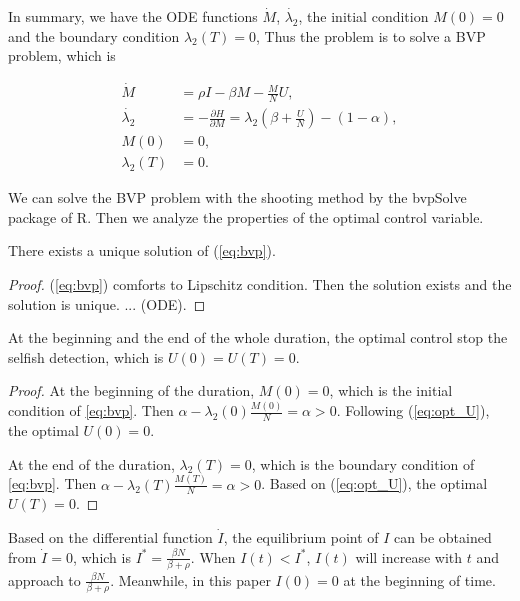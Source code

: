 In summary, we have the ODE functions $\dot{M}$, $\dot{\lambda_{2}}$,
the initial condition $M(0)=0$ and the boundary condition $\lambda_{2}(T)=0$,
Thus the problem is to solve a BVP problem,
which is
\begin{small}
\begin{equation}
\label{eq:bvp}
\begin{aligned}
\dot{M} &= \rho I  - \beta M - \frac{M}{N} U,\\
\dot{\lambda_{2}} &= - \frac{ \partial H}{ \partial M} = \lambda_{2} (\beta + \frac{U}{N} ) - (1-\alpha),\\
M(0) &= 0,\\
\lambda_{2}(T) &= 0.
\end{aligned}
\end{equation}
\end{small}
We can solve the BVP problem with the shooting method by the bvpSolve package of R.
Then we analyze the properties of the optimal control variable.
\begin{lem}
There exists a unique solution of (\ref{eq:bvp}).
\end{lem}
\begin{proof}
(\ref{eq:bvp}) comforts to Lipschitz condition.
Then the solution exists and the solution is unique. ... (ODE).
\end{proof}

\begin{lem}At the beginning and the end of the whole duration,
the optimal control stop the selfish detection,
which is $U(0)=U(T)=0$.
\end{lem}

\begin{proof}
At the beginning of the duration, $M(0)=0$,
which is the initial condition of \ref{eq:bvp}.
Then $\alpha - \lambda_{2}(0) \frac{M(0)}{N} = \alpha > 0$.
Following (\ref{eq:opt_U}), the optimal $U(0)=0$.

At the end of the duration, $\lambda_{2}(T)=0$,
which is the boundary condition of \ref{eq:bvp}.
Then $\alpha - \lambda_{2}(T) \frac{M(T)}{N} = \alpha > 0$.
Based on (\ref{eq:opt_U}), the optimal $U(T)=0$.
\end{proof}

Based on the differential function $\dot{I}$,
the equilibrium point of $I$ can be obtained from $\dot{I}=0$,
which is $I^{*}=\frac{\beta N}{\beta+\rho}$.
When $I(t)<I^{*}$, $I(t)$ will increase with $t$ and approach to $\frac{\beta N}{\beta+\rho}$.
Meanwhile, in this paper $I(0)=0$ at the beginning of time.

